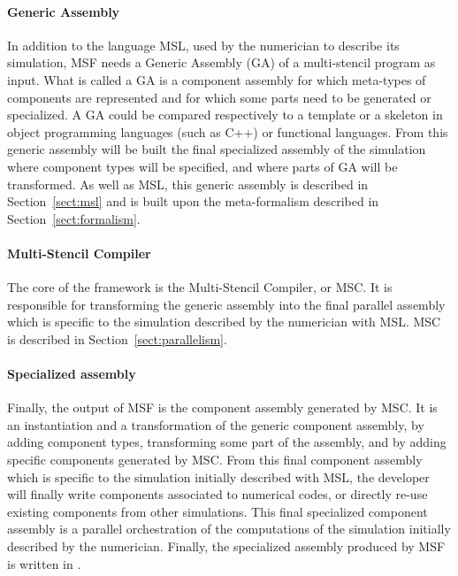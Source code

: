 \paragraph{\textbf{Generic Assembly}}
In addition to the language MSL, used by the numerician to describe its simulation, MSF needs a Generic Assembly (GA) of a multi-stencil program as input. What is called a GA is a component assembly for which meta-types of components are represented and for which some parts need to be generated or specialized. A GA could be compared respectively to a template or a skeleton in object programming languages (such as C++) or functional languages. From this generic assembly will be built the final specialized assembly of the simulation where component types will be specified, and where parts of GA will be transformed. As well as MSL, this generic assembly is described in Section~\ref{sect:msl} and is built upon the meta-formalism described in Section~\ref{sect:formalism}.

\paragraph{\textbf{Multi-Stencil Compiler}}
The core of the framework is the Multi-Stencil Compiler, or MSC. It is responsible for transforming the generic assembly into the final parallel assembly which is specific to the simulation described by the numerician with MSL. MSC is described in Section~\ref{sect:parallelism}.

\paragraph{\textbf{Specialized assembly}}
Finally, the output of MSF is the component assembly generated by MSC. It is an instantiation and a transformation of the generic component assembly, by adding component types, transforming some part of the assembly, and by adding specific components generated by MSC. From this final component assembly which is specific to the simulation initially described with MSL, the developer will finally write components associated to numerical codes, or directly re-use existing components from other simulations. This final specialized component assembly is a parallel orchestration of the computations of the simulation initially described by the numerician. Finally, the specialized assembly produced by MSF is written in \llc.
